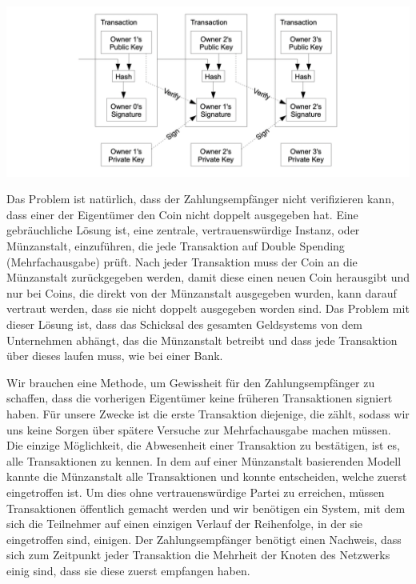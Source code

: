\documentclass[9pt]{article}
\begin{document}
	\begin{center}
		\includegraphics[scale=0.30]{pics/transactions.png}		
	\end{center}

	Das Problem ist natürlich, dass der Zahlungsempfänger nicht verifizieren kann, dass einer der Eigentümer den Coin nicht doppelt ausgegeben hat. Eine gebräuchliche Lösung ist, eine zentrale, vertrauenswürdige Instanz, oder Münzanstalt, einzuführen, die jede Transaktion auf Double Spending (Mehrfachausgabe) prüft. Nach jeder Transaktion muss der Coin an die Münzanstalt zurückgegeben werden, damit diese einen neuen Coin herausgibt und nur bei Coins, die direkt von der Münzanstalt ausgegeben wurden, kann darauf vertraut werden, dass sie nicht doppelt ausgegeben worden sind. Das Problem mit dieser Lösung ist, dass das Schicksal des gesamten Geldsystems von dem Unternehmen abhängt, das die Münzanstalt betreibt und dass jede Transaktion über dieses laufen muss, wie bei einer Bank.
	
	Wir brauchen eine Methode, um Gewissheit für den Zahlungsempfänger zu schaffen, dass die vorherigen Eigentümer keine früheren Transaktionen signiert haben. Für unsere Zwecke ist die erste Transaktion diejenige, die zählt, sodass wir uns keine Sorgen über spätere Versuche zur Mehrfachausgabe machen müssen. Die einzige Möglichkeit, die Abwesenheit einer Transaktion zu bestätigen, ist es, alle Transaktionen zu kennen. In dem auf einer Münzanstalt basierenden Modell kannte die Münzanstalt alle Transaktionen und konnte entscheiden, welche zuerst eingetroffen ist. Um dies ohne vertrauenswürdige Partei zu erreichen, müssen Transaktionen öffentlich gemacht werden \cite{dai} und wir benötigen ein System, mit dem sich die Teilnehmer auf einen einzigen Verlauf der Reihenfolge, in der sie eingetroffen sind, einigen. Der Zahlungsempfänger benötigt einen Nachweis, dass sich zum Zeitpunkt jeder Transaktion die Mehrheit der Knoten des Netzwerks einig sind, dass sie diese zuerst empfangen haben.
\end{document}
